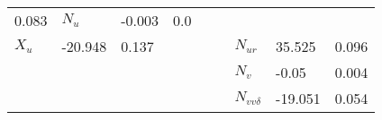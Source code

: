 \begin{table}[!htb]
\begin{tabular}{|T|T|T|T|T|T|T|T|T|}
0.083
&

\( N_{u} \)
&

-0.003
&

0.0
\\


\( X_{u} \)
&

-20.948
&

0.137
&&&&

\( N_{ur} \)
&

35.525
&

0.096
\\
&&&&&&

\( N_{v} \)
&

-0.05
&

0.004
\\
&&&&&&

\( N_{vv\delta} \)
&

-19.051
&

0.054
\\
\hline
\end{tabular}

\end{table}

